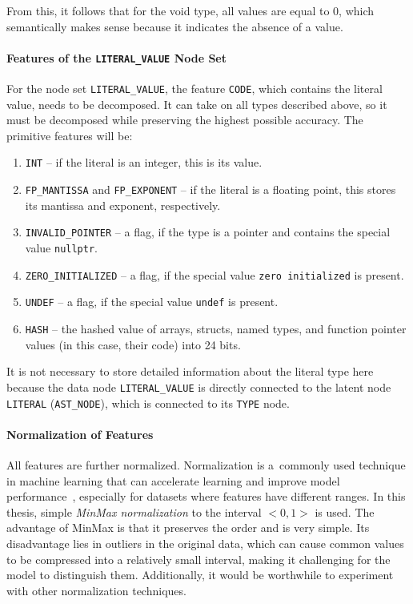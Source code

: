 From this, it follows that for the void type, all values are equal to 0, which semantically makes sense because it indicates the absence of a value.

\paragraph{Features of the \texttt{LITERAL\_VALUE} Node Set}
For the node set \texttt{LITERAL\_VALUE}, the feature \texttt{CODE}, which contains the literal value, needs to be decomposed. It can take on all types described above, so it must be decomposed while preserving the highest possible accuracy. The primitive features will be:
\begin{enumerate}
    \item \texttt{INT} -- if the literal is an integer, this is its value.
    \item \texttt{FP\_MANTISSA} and \texttt{FP\_EXPONENT} -- if the literal is a floating point, this stores its mantissa and exponent, respectively.
    \item \texttt{INVALID\_POINTER} -- a flag, if the type is a pointer and contains the special value \texttt{nullptr}.
    \item \texttt{ZERO\_INITIALIZED} -- a flag, if the special value \texttt{zero initialized} is present.
    \item \texttt{UNDEF} -- a flag, if the special value \texttt{undef} is present.
    \item \texttt{HASH} -- the hashed value of arrays, structs, named types, and function pointer values (in this case, their code) into 24 bits.
\end{enumerate}

It is not necessary to store detailed information about the literal type here because the data node \texttt{LITERAL\_VALUE} is directly connected to the latent node \texttt{LITERAL} (\texttt{AST\_NODE}), which is connected to its \texttt{TYPE} node.

\paragraph{Normalization of Features}
All features are further normalized. Normalization is a~commonly used technique in machine learning that can accelerate learning and improve model performance~\cite{norm1, norm2}, especially for datasets where features have different ranges. In this thesis, simple \textit{MinMax normalization} to the interval $<0,1>$ is used. The advantage of MinMax is that it preserves the order and is very simple. Its disadvantage lies in outliers in the original data, which can cause common values to be compressed into a relatively small interval, making it challenging for the model to distinguish them. Additionally, it would be worthwhile to experiment with other normalization techniques.


